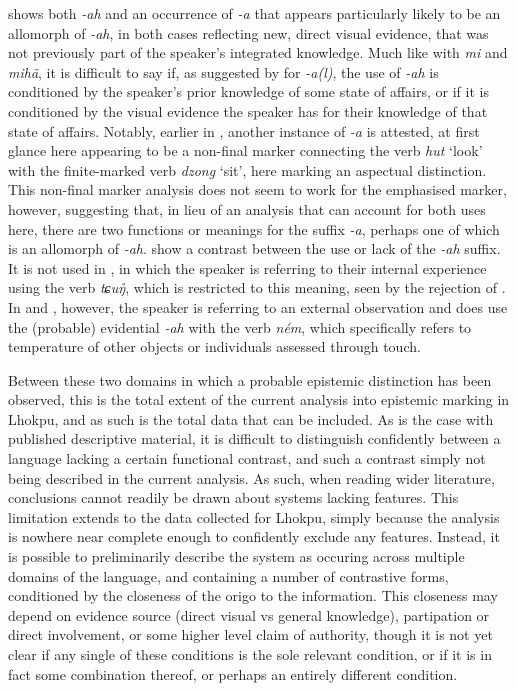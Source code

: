  shows both \textit{-ah} and an occurrence of \textit{-a} that appears particularly likely to be an allomorph of \textit{-ah}, in both cases reflecting new, direct visual evidence, that was not previously part of the speaker's integrated knowledge. Much like with \textit{mi} and \textit{mihã}, it is difficult to say if, as suggested by  for \textit{-a(l)}, the use of \textit{-ah} is conditioned by the speaker's prior knowledge of some state of affairs, or if it is conditioned by the visual evidence the speaker has for their knowledge of that state of affairs. Notably, earlier in , another instance of \textit{-a} is attested, at first glance here appearing to be a non-final marker connecting the verb \textit{hut} `look' with the finite-marked verb \textit{dzong} `sit', here marking an aspectual distinction. This non-final marker analysis does not seem to work for the emphasised marker, however, suggesting that, in lieu of an analysis that can account for both uses here, there are two functions or meanings for the suffix \textit{-a}, perhaps one of which is an allomorph of \textit{-ah}.  show a contrast between the use or lack of the \textit{-ah} suffix. It is not used in , in which the speaker is referring to their internal experience using the verb \textit{tɕuŋ̊}, which is restricted to this meaning, seen by the rejection of . In  and , however, the speaker is referring to an external observation and does use the (probable) evidential \textit{-ah} with the verb \textit{ném}, which specifically refers to temperature of other objects or individuals assessed through touch.

Between these two domains in which a probable epistemic distinction has been observed, this is the total extent of the current analysis into epistemic marking in Lhokpu, and as such is the total data that can be included. As is the case with published descriptive material, it is difficult to distinguish confidently between a language lacking a certain functional contrast, and such a contrast simply not being described in the current analysis. As such, when reading wider literature, conclusions cannot readily be drawn about systems lacking features. This limitation extends to the data collected for Lhokpu, simply because the analysis is nowhere near complete enough to confidently exclude any features. Instead, it is possible to preliminarily describe the system as occuring across multiple domains of the language, and containing a number of contrastive forms, conditioned by the closeness of the origo to the information. This closeness may depend on evidence source (direct visual vs general knowledge), partipation or direct involvement, or some higher level claim of authority, though it is not yet clear if any single of these conditions is the sole relevant condition, or if it is in fact some combination thereof, or perhaps an entirely different condition.


